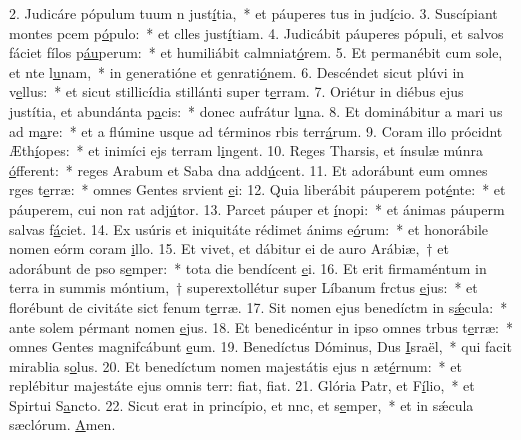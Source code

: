 2. Judicáre pópulum tuum n just\uline{í}tia,~* et páuperes tus in jud\uline{í}cio.
3. Suscípiant montes pcem p\uline{ó}pulo:~* et clles just\uline{í}tiam.
4. Judicábit páuperes pópuli, et salvos fáciet fílos p\uline{áu}perum:~* et humiliábit calmniat\uline{ó}rem.
5. Et permanébit cum sole, et nte l\uline{u}nam,~* in generatióne et genrati\uline{ó}nem.
6. Descéndet sicut plúvi in v\uline{e}llus:~* et sicut stillicídia stillánti super t\uline{e}rram.
7. Oriétur in diébus ejus justítia, et abundánta p\uline{a}cis:~* donec aufrátur l\uline{u}na.
8. Et dominábitur a mari us ad m\uline{a}re:~* et a flúmine usque ad términos rbis terr\uline{á}rum.
9. Coram illo prócidnt Æth\uline{í}opes:~* et inimíci ejs terram l\uline{i}ngent.
10. Reges Tharsis, et ínsulæ múnra \uline{ó}fferent:~* reges Arabum et Saba dna add\uline{ú}cent.
11. Et adorábunt eum omnes rges t\uline{e}rræ:~* omnes Gentes srvient \uline{e}i:
12. Quia liberábit páuperem  pot\uline{é}nte:~* et páuperem, cui non rat adj\uline{ú}tor.
13. Parcet páuper et \uline{í}nopi:~* et ánimas páuperm salvas f\uline{á}ciet.
14. Ex usúris et iniquitáte rédimet ánims e\uline{ó}rum:~* et honorábile nomen eórm coram \uline{i}llo.
15. Et vivet, et dábitur ei de auro Arábiæ,~† et adorábunt de pso s\uline{e}mper:~* tota die bendícent \uline{e}i.
16. Et erit firmaméntum in terra in summis móntium,~† superextollétur super Líbanum frctus \uline{e}jus:~* et florébunt de civitáte sict fenum t\uline{e}rræ.
17. Sit nomen ejus benedíctm in s\uline{ǽ}cula:~* ante solem pérmant nomen \uline{e}jus.
18. Et benedicéntur in ipso omnes trbus t\uline{e}rræ:~* omnes Gentes magnifcábunt \uline{e}um.
19. Benedíctus Dóminus, Dus \uline{I}sraël,~* qui facit mirablia s\uline{o}lus.
20. Et benedíctum nomen majestátis ejus n æt\uline{é}rnum:~* et replébitur majestáte ejus omnis terr: fiat, f\uline{i}at.
21. Glória Patr, et F\uline{í}lio,~* et Spirtui S\uline{a}ncto.
22. Sicut erat in princípio, et nnc, et s\uline{e}mper,~* et in sǽcula sæclórum. \uline{A}men.
